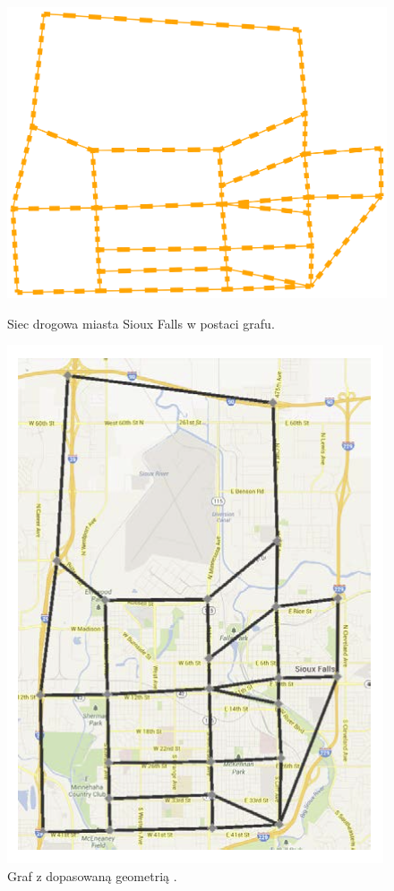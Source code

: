 \documentclass[twoside,12pt]{report}
\begin{document}
\vspace*{50px}
\begin{figure}[h]
\begin{flushleft}
\begin{minipage}[b]{.45\textwidth}
	\includegraphics[width=.9\linewidth]{img/graf}
	\caption{Siec drogowa miasta Sioux Falls w postaci grafu.}
\end{minipage}%
\end{flushleft}
\begin{flushright}
	\begin{minipage}[b]{.45\textwidth}
	\flushright
	\includegraphics[width=.9\linewidth]{img/dopasowanie}
	\caption{Graf z dopasowaną geometrią \cite{siux}.}
	\end{minipage}
\end{flushright}
\end{figure}
\end{document}
